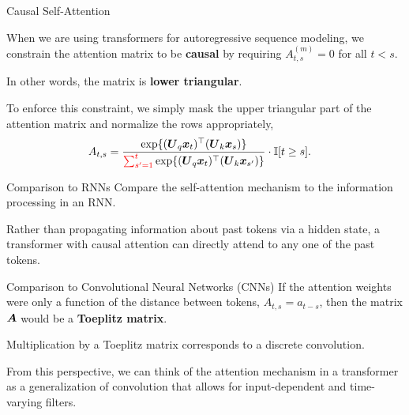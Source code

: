 \documentclass[aspectratio=169]{beamer}
\begin{document}
\begin{frame}[t,allowframebreaks]{Causal Self-Attention}

When we are using transformers for autoregressive sequence modeling, we
constrain the attention matrix to be \textbf{causal} by requiring
\(A_{t,s}^{(m)} = 0\) for all \(t < s\). 

In other words, the matrix is \textbf{lower triangular}.

To enforce this constraint, we simply mask the upper triangular part of the attention
matrix and normalize the rows appropriately, 
\begin{align*}
A_{t,s} &= \frac{\exp \{ (\boldsymbol{U}_q \boldsymbol{x}_t)^\top (\boldsymbol{U}_k \boldsymbol{x}_s)\}}{\textcolor{red}{\sum_{s'=1}^{t}} \exp\{(\boldsymbol{U}_q \boldsymbol{x}_t)^\top (\boldsymbol{U}_k \boldsymbol{x}_{s'})\}} \cdot \mathbb{I}[t \geq s].
\end{align*}
\end{frame}

\begin{frame}[t,allowframebreaks]{Comparison to RNNs }
Compare the self-attention mechanism to the information processing in an RNN. 

Rather than propagating information about past tokens via a hidden state, a
transformer with causal attention can directly attend to any one of the
past tokens.
\end{frame}

\begin{frame}[t,allowframebreaks]{Comparison to Convolutional Neural Networks (CNNs)}
If the attention weights were only a function of the distance between
tokens, \(A_{t,s} = a_{t-s}\), then the matrix \(\boldsymbol{A}\) would be a
\textbf{Toeplitz matrix}. 

Multiplication by a Toeplitz matrix corresponds to a discrete convolution. 

From this perspective, we can think of the attention mechanism in a transformer 
as a generalization of convolution that allows for input-dependent and 
time-varying filters.
\end{frame}
\end{document}
